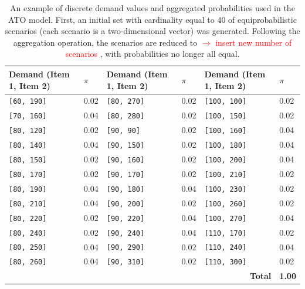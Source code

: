 \documentclass[a4paper,12pt]{article}
\begin{document}
	\begin{table}[H]
		\centering
		\footnotesize
		\label{tab:ato-general-results}
		\renewcommand{\arraystretch}{1.1}
		\begin{tabular}{|@{\hskip 2pt}p{3.2cm}@{\hskip 2pt}|@{\hskip 2pt}p{1cm}@{\hskip 2pt}||@{\hskip 2pt}p{3.2cm}@{\hskip 2pt}|@{\hskip 2pt}p{1cm}@{\hskip 2pt}||@{\hskip 2pt}p{3.2cm}@{\hskip 2pt}|@{\hskip 2pt}p{1cm}@{\hskip 2pt}|}
			\hline
			\textbf{Demand (Item 1, Item 2)} & \textbf{$\pi$} &
			\textbf{Demand (Item 1, Item 2)} & \textbf{$\pi$} &
			\textbf{Demand (Item 1, Item 2)} & \textbf{$\pi$} \\
			\hline
			\texttt{[60, 190]}  & 0.02 & \texttt{[80, 270]} & 0.02 & \texttt{[100, 100]} & 0.02 \\
			\texttt{[70, 160]}  & 0.04 & \texttt{[80, 280]} & 0.02 & \texttt{[100, 150]} & 0.02 \\
			\texttt{[80, 120]}  & 0.02 & \texttt{[90, 90]}   & 0.02 & \texttt{[100, 160]} & 0.04 \\
			\texttt{[80, 140]}  & 0.04 & \texttt{[90, 150]}  & 0.02 & \texttt{[100, 180]} & 0.04 \\
			\texttt{[80, 150]}  & 0.02 & \texttt{[90, 160]}  & 0.02 & \texttt{[100, 200]} & 0.04 \\
			\texttt{[80, 170]}  & 0.02 & \texttt{[90, 170]}  & 0.02 & \texttt{[100, 210]} & 0.02 \\
			\texttt{[80, 190]}  & 0.04 & \texttt{[90, 180]}  & 0.04 & \texttt{[100, 230]} & 0.02 \\
			\texttt{[80, 210]}  & 0.04 & \texttt{[90, 200]}  & 0.02 & \texttt{[100, 260]} & 0.02 \\
			\texttt{[80, 220]}  & 0.02 & \texttt{[90, 220]}  & 0.04 & \texttt{[100, 270]} & 0.04 \\
			\texttt{[80, 240]}  & 0.02 & \texttt{[90, 240]}  & 0.04 & \texttt{[110, 170]} & 0.02 \\
			\texttt{[80, 250]}  & 0.04 & \texttt{[90, 290]}  & 0.02 & \texttt{[110, 240]} & 0.04 \\
			\texttt{[80, 260]}  & 0.04 & \texttt{[90, 310]}  & 0.02 & \texttt{[110, 300]} & 0.02 \\
			\hline
			\multicolumn{5}{|r|}{\textbf{Total}} & \textbf{1.00} \\
			\hline
		\end{tabular}
		\caption{An example of discrete demand values and aggregated probabilities used in the ATO model. First, an initial set with cardinality equal to 40 of equiprobabilistic scenarios (each scenario is a two-dimensional vector) was generated. Following the aggregation operation, the scenarios are reduced to \textcolor{red}{$\rightarrow$ insert new number of scenarios} , with probabilities no longer all equal.}
	\end{table}
	
\end{document}
